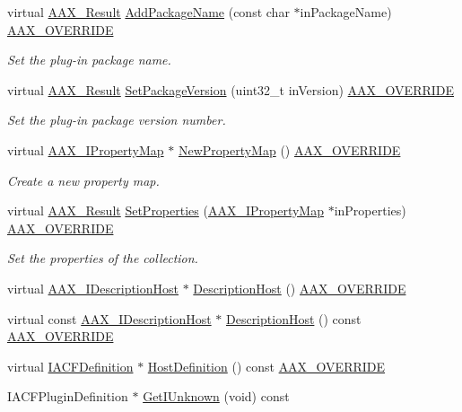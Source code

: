 \begin{DoxyCompactItemize}
virtual \hyperlink{a00149_a4d8f69a697df7f70c3a8e9b8ee130d2f}{A\+A\+X\+\_\+\+Result} \hyperlink{a00130_aae06470b0d07232622fbe29e898490d0}{Add\+Package\+Name} (const char $\ast$in\+Package\+Name) \hyperlink{a00149_ac2f24a5172689ae684344abdcce55463}{A\+A\+X\+\_\+\+O\+V\+E\+R\+R\+I\+D\+E}
\begin{DoxyCompactList}\small\item\em Set the plug-\/in package name. \end{DoxyCompactList}\item 
virtual \hyperlink{a00149_a4d8f69a697df7f70c3a8e9b8ee130d2f}{A\+A\+X\+\_\+\+Result} \hyperlink{a00130_ab5851c0566b99aad61e10afe13d23bf5}{Set\+Package\+Version} (uint32\+\_\+t in\+Version) \hyperlink{a00149_ac2f24a5172689ae684344abdcce55463}{A\+A\+X\+\_\+\+O\+V\+E\+R\+R\+I\+D\+E}
\begin{DoxyCompactList}\small\item\em Set the plug-\/in package version number. \end{DoxyCompactList}\item 
virtual \hyperlink{a00112}{A\+A\+X\+\_\+\+I\+Property\+Map} $\ast$ \hyperlink{a00130_ae8666d0dfec390004d5199bdf4c0f284}{New\+Property\+Map} () \hyperlink{a00149_ac2f24a5172689ae684344abdcce55463}{A\+A\+X\+\_\+\+O\+V\+E\+R\+R\+I\+D\+E}
\begin{DoxyCompactList}\small\item\em Create a new property map. \end{DoxyCompactList}\item 
virtual \hyperlink{a00149_a4d8f69a697df7f70c3a8e9b8ee130d2f}{A\+A\+X\+\_\+\+Result} \hyperlink{a00130_a8bdb50050f90c5ea3c189a92fba16f5b}{Set\+Properties} (\hyperlink{a00112}{A\+A\+X\+\_\+\+I\+Property\+Map} $\ast$in\+Properties) \hyperlink{a00149_ac2f24a5172689ae684344abdcce55463}{A\+A\+X\+\_\+\+O\+V\+E\+R\+R\+I\+D\+E}
\begin{DoxyCompactList}\small\item\em Set the properties of the collection. \end{DoxyCompactList}\item 
virtual \hyperlink{a00091}{A\+A\+X\+\_\+\+I\+Description\+Host} $\ast$ \hyperlink{a00130_a6eda35807e8573dcf02706b9016248fb}{Description\+Host} () \hyperlink{a00149_ac2f24a5172689ae684344abdcce55463}{A\+A\+X\+\_\+\+O\+V\+E\+R\+R\+I\+D\+E}
\item 
virtual const \hyperlink{a00091}{A\+A\+X\+\_\+\+I\+Description\+Host} $\ast$ \hyperlink{a00130_a8eb37af47511ecf6b08eb80f325bb08b}{Description\+Host} () const \hyperlink{a00149_ac2f24a5172689ae684344abdcce55463}{A\+A\+X\+\_\+\+O\+V\+E\+R\+R\+I\+D\+E}
\item 
virtual \hyperlink{a00145}{I\+A\+C\+F\+Definition} $\ast$ \hyperlink{a00130_a7622e015fa99c8504d42f99181b1d473}{Host\+Definition} () const \hyperlink{a00149_ac2f24a5172689ae684344abdcce55463}{A\+A\+X\+\_\+\+O\+V\+E\+R\+R\+I\+D\+E}
\item 
I\+A\+C\+F\+Plugin\+Definition $\ast$ \hyperlink{a00130_a1004f47db07fc8a05fcda4cc2a452700}{Get\+I\+Unknown} (void) const 
\end{DoxyCompactItemize}


